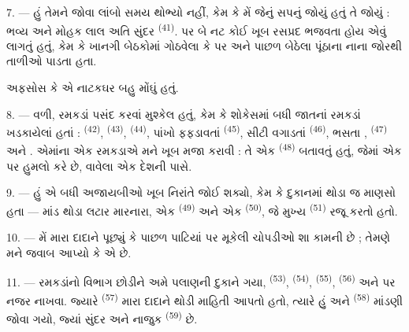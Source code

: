 7. --- હું તેમને જોવા લાંબો સમય થોભ્યો નહીં, કેમ કે મેં જેનું સપનું
જોયું હતું તે જોયું : ભવ્ય  અને મોહક લાલ
 અતિ સુંદર 
\textsuperscript{(41)}.  પર બે નટ કોઈ ખૂબ રસપ્રદ
  ભજવતા હોય એવું લાગતું હતું, કેમ કે
ખાનગી બેઠકોમાં ગોઠવેલા કે  પર અને
 પાછળ  બેઠેલા
પૂંઠાના નાના  જોરથી તાળીઓ પાડતા હતા.

અફસોસ કે એ નાટકઘર બહુ મોંઘું હતું.

8. --- વળી, રમકડાં પસંદ કરવાં મુશ્કેલ હતું, કેમ કે શોકેસમાં બધી
જાતનાં રમકડાં ખડકાયેલાં હતાં :  \textsuperscript{(42)},
 \textsuperscript{(43)}, 
\textsuperscript{(44)}, પાંખો ફફડાવતાં 
\textsuperscript{(45)}, સીટી વગાડતાં 
\textsuperscript{(46)}, ભસતા ,
 \textsuperscript{(47)} અને .
એમાંના એક રમકડાએ મને ખૂબ મજા કરાવી : તે એક 
\textsuperscript{(48)} બતાવતું હતું, જેમાં એક  પર
 હુમલો કરે છે,  વાવેલા એક
દેશની પાસે.


9. --- હું એ બધી અજાયબીઓ ખૂબ નિરાંતે જોઈ શક્યો, કેમ કે દુકાનમાં થોડા
જ માણસો હતા — માંડ થોડા લટાર મારનારા, એક 
\textsuperscript{(49)} અને એક 
\textsuperscript{(50)}, જે મુખ્ય  \textsuperscript{(51)}
 રજૂ કરતો હતો.

10. --- મેં મારા દાદાને પૂછ્યું કે  પાછળ પાટિયાં પર
મૂકેલી ચોપડીઓ શા કામની છે ; તેમણે મને જવાબ આપ્યો કે એ
 છે.

\VUsaut{3.6mm}
\VUsaut{2.8mm}

11. --- રમકડાંનો વિભાગ છોડીને અમે પલાણની દુકાને ગયા, 
\textsuperscript{(53)},  \textsuperscript{(54)},
 \textsuperscript{(55)}, 
\textsuperscript{(56)} અને  પર નજર નાખવા. જ્યારે
 \textsuperscript{(57)} મારા દાદાને થોડી માહિતી
આપતો હતો, ત્યારે હું  અને
 \textsuperscript{(58)} માંડણી જોવા ગયો, જ્યાં
સુંદર  અને નાજુક 
\textsuperscript{(59)} છે.

